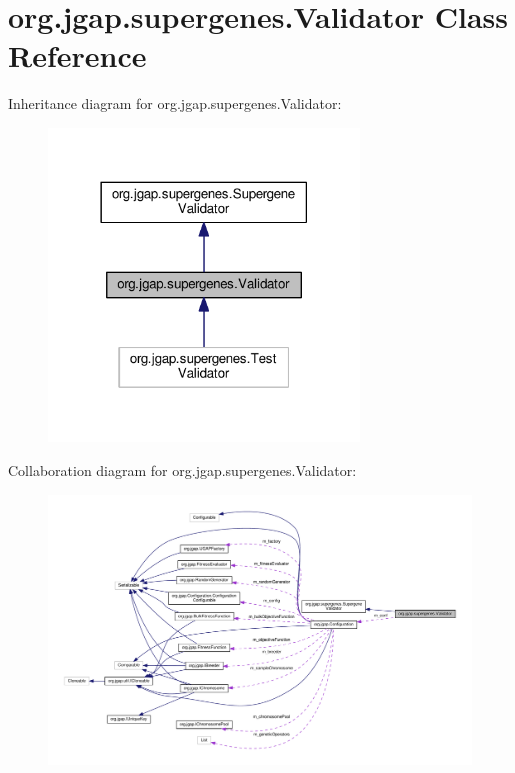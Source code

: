 \hypertarget{classorg_1_1jgap_1_1supergenes_1_1_validator}{\section{org.\-jgap.\-supergenes.\-Validator Class Reference}
\label{classorg_1_1jgap_1_1supergenes_1_1_validator}
}


Inheritance diagram for org.\-jgap.\-supergenes.\-Validator\-:
\nopagebreak
\begin{figure}[H]
\begin{center}
\leavevmode
\includegraphics[width=234pt]{classorg_1_1jgap_1_1supergenes_1_1_validator__inherit__graph}
\end{center}
\end{figure}


Collaboration diagram for org.\-jgap.\-supergenes.\-Validator\-:
\nopagebreak
\begin{figure}[H]
\begin{center}
\leavevmode
\includegraphics[width=350pt]{classorg_1_1jgap_1_1supergenes_1_1_validator__coll__graph}
\end{center}
\end{figure}

